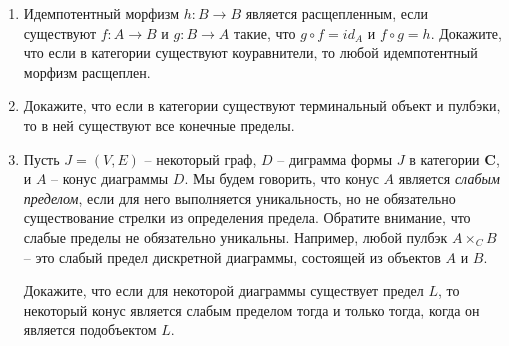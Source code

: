 \documentclass[draft]{article}
\newcommand{\cat}[1]{\mathbf{#1}}
\renewcommand{\C}{\cat{C}}
\begin{document}
\begin{enumerate}
\item Идемпотентный морфизм $h : B \to B$ является расщепленным, если существуют $f : A \to B$ и $g : B \to A$ такие, что $g \circ f = id_A$ и $f \circ g = h$.
Докажите, что если в категории существуют коуравнители, то любой идемпотентный морфизм расщеплен.

\item Докажите, что если в категории существуют терминальный объект и пулбэки, то в ней существуют все конечные пределы.

\item Пусть $J = (V,E)$ -- некоторый граф, $D$ -- диграмма формы $J$ в категории $\C$, и $A$ -- конус диаграммы $D$.
Мы будем говорить, что конус $A$ является \emph{слабым пределом}, если для него выполняется уникальность, но не обязательно существование стрелки из определения предела.
Обратите внимание, что слабые пределы не обязательно уникальны.
Например, любой пулбэк $A \times_C B$ -- это слабый предел дискретной диаграммы, состоящей из объектов $A$ и $B$.

Докажите, что если для некоторой диаграммы существует предел $L$, то некоторый конус является слабым пределом тогда и только тогда, когда он является подобъектом $L$.

\end{enumerate}
\end{document}
